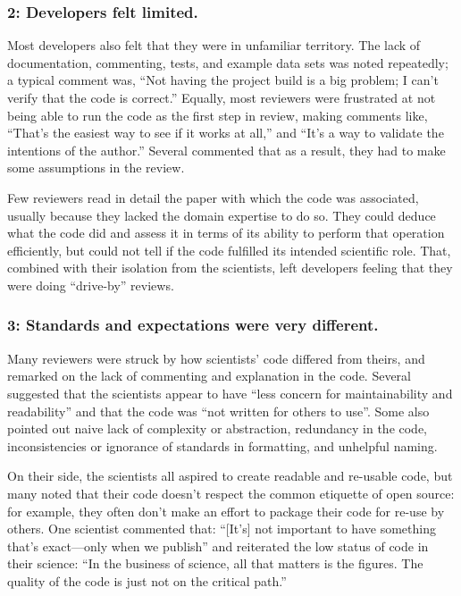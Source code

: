 \documentclass[10pt,twocolumn]{article}
\begin{document}
\subsubsection*{2: Developers felt limited.}

Most developers also felt that they were in unfamiliar territory.
The lack of documentation, commenting, tests, and example data sets was noted repeatedly;
a typical comment was,
``Not having the project build is a big problem; I can't verify that the code is correct.''
Equally,
most reviewers were frustrated at not being able to run the code as the first step in review,
making comments like,
``That's the easiest way to see if it works at all,'' and ``It's a way to validate the intentions of the author.''
Several commented that as a result, they had to make some assumptions in the review.

Few reviewers read in detail the paper with which the code was associated,
usually because they lacked the domain expertise to do so.
They could deduce what the code did and assess it in terms of its ability to perform that operation efficiently,
but could not tell if the code fulfilled its intended scientific role.
That,
combined with their isolation from the scientists,
left developers feeling that they were doing ``drive-by'' reviews.

\subsubsection*{3: Standards and expectations were very different.}

Many reviewers were struck by how scientists' code differed from theirs,
and remarked on the lack of commenting and explanation in the code.
Several suggested that the scientists appear to have ``less concern for maintainability and readability''
and that the code was ``not written for others to use''.
Some also pointed out naive lack of complexity or abstraction,
redundancy in the code,
inconsistencies or ignorance of standards in formatting,
and unhelpful naming.

On their side,
the scientists all aspired to create readable and re-usable code,
but many noted that their code doesn't respect the common etiquette of open source:
for example,
they often don't make an effort to package their code for re-use by others.
One scientist commented that:
``[It's] not important to have something that's exact---only when we publish''
and reiterated the low status of code in their science:
``In the business of science, all that matters is the figures.
The quality of the code is just not on the critical path.''
\end{document}
